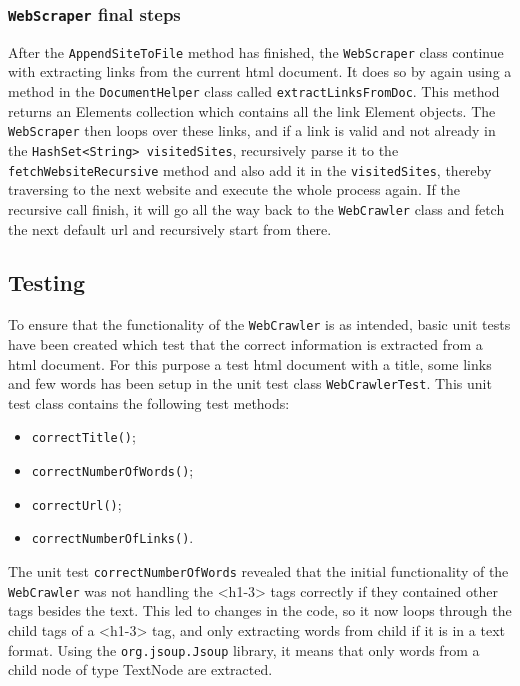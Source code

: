 \subsubsection{{\tt WebScraper} final steps}
After the {\tt AppendSiteToFile} method has finished, the {\tt WebScraper} class continue with extracting links from the current html document. It does so by again using a method in the {\tt DocumentHelper} class called {\tt extractLinksFromDoc}. This method returns an Elements collection which contains all the link Element objects. The {\tt WebScraper} then loops over these links, and if a link is valid and not already in the {\tt HashSet<String> visitedSites}, recursively parse it to the {\tt fetchWebsiteRecursive} method and also add it in the {\tt visitedSites}, thereby traversing to the next website and execute the whole process again. If the recursive call finish, it will go all the way back to the {\tt WebCrawler} class and fetch the next default url and recursively start from there.


\subsection{Testing}
To ensure that the functionality of the {\tt WebCrawler} is as intended, basic unit tests have been created which test that the correct information is extracted from a html document. For this purpose a test html document with a title, some links and few words has been setup in the unit test class {\tt WebCrawlerTest}. This unit test class contains the following test methods:
\begin{itemize}
    \item {\tt correctTitle()};
    \item {\tt correctNumberOfWords()};
    \item {\tt correctUrl()};
    \item {\tt correctNumberOfLinks()}.
\end{itemize}

The unit test {\tt correctNumberOfWords} revealed that the initial functionality of the {\tt WebCrawler} was not handling the <h1-3> tags correctly if they contained other tags besides the text. This led to changes in the code, so it now loops through the child tags of a <h1-3> tag, and only extracting words from child if it is in a text format. Using the {\tt org.jsoup.Jsoup} library, it means that only words from a child node of type TextNode are extracted.

